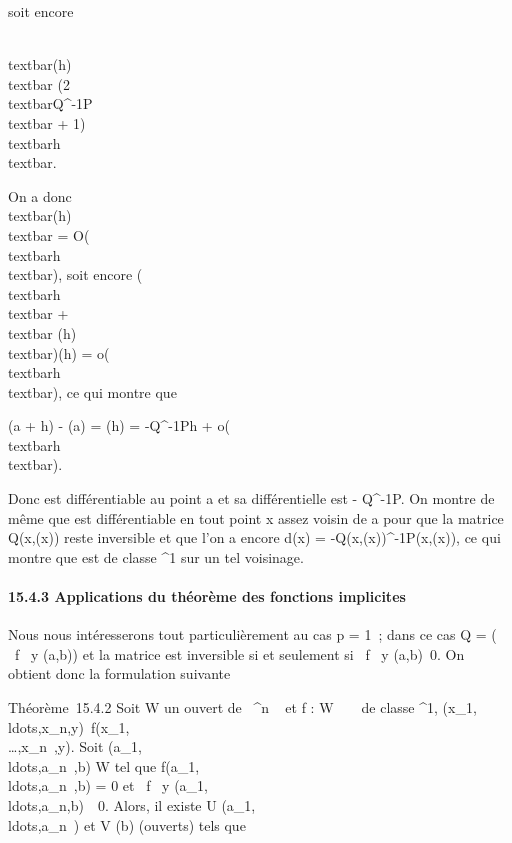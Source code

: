 \documentclass[]{article}
\begin{document}
soit encore

\\textbar{}\theta(h)\\textbar{} \leq
(2\\textbar{}Q^-1P\\textbar{} +
1)\\textbar{}h\\textbar{}.

On a donc \\textbar{}\theta(h)\\textbar{} =
O(\\textbar{}h\\textbar{}), soit encore
(\\textbar{}h\\textbar{}
+\\textbar{} \theta(h)\\textbar{})\eta(h) =
o(\\textbar{}h\\textbar{}), ce qui montre
que

\phi(a + h) - \phi(a) = \theta(h) = -Q^-1Ph +
o(\\textbar{}h\\textbar{}).

Donc \phi est différentiable au point a et sa différentielle est -
Q^-1P. On montre de même que \phi est différentiable en tout
point x assez voisin de a pour que la matrice Q(x,\phi(x)) reste inversible
et que l'on a encore d\phi(x) = -Q(x,\phi(x))^-1P(x,\phi(x)), ce qui
montre que \phi est de classe ^1 sur un tel voisinage.

\paragraph{15.4.3 Applications du théorème des fonctions implicites}

Nous nous intéresserons tout particulièrement au cas p = 1~; dans ce cas
Q = \left (\matrix\, \partial~f
\over \partial~y (a,b)\right ) et la matrice
est inversible si et seulement si  \partial~f \over \partial~y
(a,b)\neq~0. On obtient donc la formulation
suivante

Théorème~15.4.2 Soit W un ouvert de ~^n \times {}~ et f : W \rightarrow~ ~ de
classe ^1,
(x\_1,\\ldots,x\_n,y)\mapsto~f(x\_1,\\\ldots,x\_n~,y).
Soit
(a\_1,\\ldots,a\_n~,b)
\in W tel que
f(a\_1,\\ldots,a\_n~,b)
= 0 et  \partial~f \over \partial~y
(a\_1,\\ldots,a\_n,b)\mathrel\neq~~0.
Alors, il existe U
\inV(a\_1,\\ldots,a\_n~)
et V \inV(b) (ouverts) tels que
\end{document}
